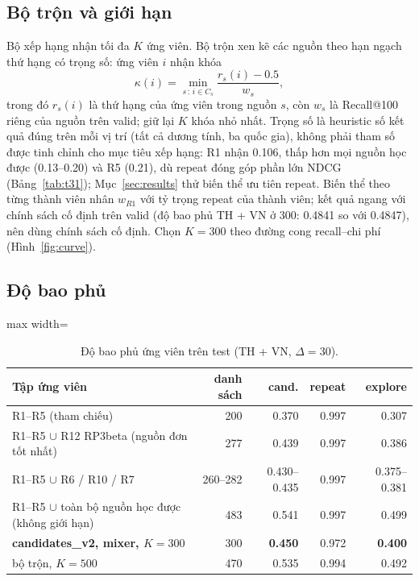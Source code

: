 \documentclass[jtehm]{ieeeaccess}
\newcommand{\nK}{300}                %
\begin{document}
\subsection{Bộ trộn và giới hạn}
Bộ xếp hạng nhận tối đa $K$ ứng viên. Bộ trộn xen kẽ các nguồn theo hạn ngạch thứ hạng có trọng số: ứng viên $i$ nhận khóa
\begin{equation}
\kappa(i) = \min_{s \,:\, i \in C_s} \frac{r_s(i) - 0.5}{w_s},
\end{equation}
trong đó $r_s(i)$ là thứ hạng của ứng viên trong nguồn $s$, còn $w_s$ là Recall@100 riêng của nguồn trên valid; giữ lại $K$ khóa nhỏ nhất. Trọng số là heuristic số kết quả đúng trên mỗi vị trí (tất cả dương tính, ba quốc gia), không phải tham số được tinh chỉnh cho mục tiêu xếp hạng: R1 nhận 0.106, thấp hơn mọi nguồn học được (0.13--0.20) và R5 (0.21), dù repeat đóng góp phần lớn NDCG (Bảng~\ref{tab:t31}); Mục~\ref{sec:results} thử biến thể ưu tiên repeat. Biến thể theo từng thành viên nhân $w_{R1}$ với tỷ trọng repeat của thành viên; kết quả ngang với chính sách cố định trên valid (độ bao phủ TH + VN ở 300: 0.4841 so với 0.4847), nên dùng chính sách cố định. Chọn $K = \nK{}$ theo đường cong recall--chi phí (Hình~\ref{fig:curve}).

\subsection{Độ bao phủ}

\begin{table}[t]
\caption{Độ bao phủ ứng viên trên test (TH + VN, $\Delta = 30$).}
\label{tab:t30}
\setlength{\tabcolsep}{3pt}
\centering
\begin{adjustbox}{max width=\columnwidth}
\begin{tabular}{lrrrr}
\toprule
Tập ứng viên & danh sách & cand. & repeat & explore \\
\midrule
R1--R5 (tham chiếu)                       & 200     & 0.370 & 0.997 & 0.307 \\
R1--R5 $\cup$ R12 RP3beta (nguồn đơn tốt nhất)  & 277     & 0.439 & 0.997 & 0.386 \\
R1--R5 $\cup$ R6 / R10 / R7              & 260--282 & 0.430--0.435 & 0.997 & 0.375--0.381 \\
R1--R5 $\cup$ toàn bộ nguồn học được (không giới hạn)     & 483     & 0.541 & 0.997 & 0.499 \\
\textbf{candidates\_v2, mixer, $K = 300$} & 300    & \textbf{0.450} & 0.972 & \textbf{0.400} \\
bộ trộn, $K = 500$                          & 470    & 0.535 & 0.994 & 0.492 \\
\bottomrule
\end{tabular}
\end{adjustbox}
\end{table}
\end{document}
